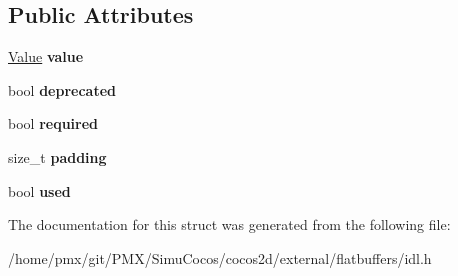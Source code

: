 \subsection*{Public Attributes}
\begin{DoxyCompactItemize}
\item 
\mbox{\label{structflatbuffers_1_1FieldDef_ab3b6d7aefda349d45e038de93c4c82b3}} 
\hyperlink{structflatbuffers_1_1Value}{Value} {\bfseries value}
\item 
\mbox{\label{structflatbuffers_1_1FieldDef_ae17d9e56d4c109d6110eb15895a46813}} 
bool {\bfseries deprecated}
\item 
\mbox{\label{structflatbuffers_1_1FieldDef_a280528886f7d442b05f8e1e88b4f67e8}} 
bool {\bfseries required}
\item 
\mbox{\label{structflatbuffers_1_1FieldDef_a94e744009a8b3e0ea248c7b72e762c14}} 
size\+\_\+t {\bfseries padding}
\item 
\mbox{\label{structflatbuffers_1_1FieldDef_af18f1b44435806fbe46ced8d3b34deae}} 
bool {\bfseries used}
\end{DoxyCompactItemize}


The documentation for this struct was generated from the following file\+:\begin{DoxyCompactItemize}
\item 
/home/pmx/git/\+P\+M\+X/\+Simu\+Cocos/cocos2d/external/flatbuffers/idl.\+h\end{DoxyCompactItemize}
